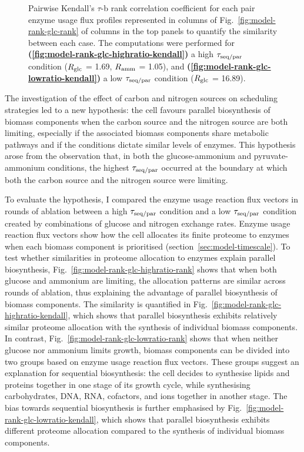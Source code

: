 \begin{figure}
  \caption{
    Pairwise Kendall's $\tau$-b rank correlation coefficient \parencite{kendallTREATMENTTIESRANKING1945} for each pair enzyme usage flux profiles represented in columns of Fig.\ \ref{fig:model-rank-glc-rank} of columns in the top panels to quantify the similarity between each case.
    The computations were performed for \textbf{(\ref{fig:model-rank-glc-highratio-kendall})} a high $\tau_{\mathrm{seq}/\mathrm{par}}$ condition ($R_{\mathrm{glc}}$ = \SI{1.69}{\mmolgdwh}, $R_{\mathrm{amm}}$ = \SI{1.05}{\mmolgdwh}), and \textbf{(\ref{fig:model-rank-glc-lowratio-kendall})} a low $\tau_{\mathrm{seq}/\mathrm{par}}$ condition ($R_{\mathrm{glc}}$ = \SI{16.89}{\mmolgdwh}).
  }
  \label{fig:model-rank-glc-kendall}
\end{figure}

The investigation of the effect of carbon and nitrogen sources on scheduling strategies led to a new hypothesis: the cell favours parallel biosynthesis of biomass components when the carbon source and the nitrogen source are both limiting, especially if the associated biomass components share metabolic pathways and if the conditions dictate similar levels of enzymes.
This hypothesis arose from the observation that, in both the glucose-ammonium and pyruvate-ammonium conditions, the highest $\tau_{\mathrm{seq}/\mathrm{par}}$ occurred at the boundary at which both the carbon source and the nitrogen source were limiting.

To evaluate the hypothesis, I compared the enzyme usage reaction flux vectors in rounds of ablation between a high $\tau_{\mathrm{seq}/\mathrm{par}}$ condition and a low $\tau_{\mathrm{seq}/\mathrm{par}}$ condition created by combinations of glucose and nitrogen exchange rates.
Enzyme usage reaction flux vectors show how the cell allocates its finite proteome to enzymes when each biomass component is prioritised (section~\ref{sec:model-timescale}).
To test whether similarities in proteome allocation to enzymes explain parallel biosynthesis, Fig.\ \ref{fig:model-rank-glc-highratio-rank} shows that when both glucose and ammonium are limiting, the allocation patterns are similar across rounds of ablation, thus explaining the advantage of parallel biosynthesis of biomass components.
The similarity is quantified in Fig.\ \ref{fig:model-rank-glc-highratio-kendall}, which shows that parallel biosynthesis exhibits relatively similar proteome allocation with the synthesis of individual biomass components.
In contrast, Fig.\ \ref{fig:model-rank-glc-lowratio-rank} shows that when neither glucose nor ammonium limits growth, biomass components can be divided into two groups based on enzyme usage reaction flux vectors.
These groups suggest an explanation for sequential biosynthesis: the cell decides to synthesise lipids and proteins together in one stage of its growth cycle, while synthesising carbohydrates, DNA, RNA, cofactors, and ions together in another stage.
The bias towards sequential biosynthesis is further emphasised by Fig.\ \ref{fig:model-rank-glc-lowratio-kendall}, which shows that parallel biosynthesis exhibits different proteome allocation compared to the synthesis of individual biomass components.


